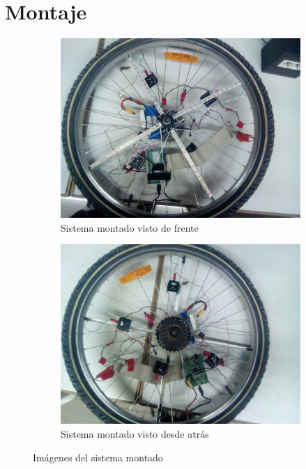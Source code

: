 \section{Montaje}
\begin{figure}[!hb]
	\centering

	\begin{subfigure}[t]{0.4\textwidth}
		\centering
		\includegraphics[width=\textwidth]{images/rueda-front}
		\caption{Sistema montado visto de frente}
		\label{fig:rueda-front}
	\end{subfigure}
	\hspace{0.5cm}
	\begin{subfigure}[t]{0.4\textwidth}
		\centering
		\includegraphics[width=\textwidth]{images/rueda-back}
		\caption{Sistema montado visto desde atrás}
		\label{fig:rueda-back}
	\end{subfigure}

	\caption{Imágenes del sistema montado}
	\label{fig:rueda}
\end{figure}

